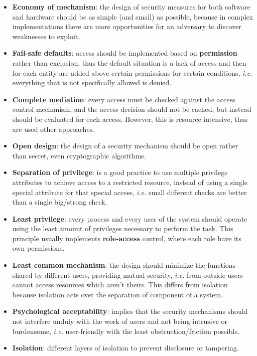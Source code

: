 \documentclass[oneside]{academica}
\begin{document}
\begin{itemize}
  \item \textbf{Economy of mechanism}: the design of security measures for both software and hardware should be as simple (and small) as possible, because in complex implementations there are more opportunities for an adversary to discover weaknesses to exploit.
  \item \textbf{Fail-safe defaults}: access should be implemented based on \textbf{permission} rather than exclusion, thus the default situation is a lack of access and then for each entity are added above certain permissions for certain conditions, \textit{i.e.} everything that is not specifically allowed is denied.
  \item \textbf{Complete mediation}: every access must be checked against the access control mechanism, and the access decision should not be cached, but instead should be evaluated for each access.
    However, this is resource intensive, thus are used other approaches.
  \item \textbf{Open design}: the design of a security mechanism should be open rather than secret, even cryptographic algorithms.
  \item \textbf{Separation of privilege}: is a good practice to use multiple privilege attributes to achieve access to a restricted resource, instead of using a single special attribute for that special access, \textit{i.e.} small different checks are better than a single big/strong check.
  \item \textbf{Least privilege}: every process and every user of the system should operate using the least amount of privileges necessary to perform the task.
    This principle usually implements \textbf{role-access} control, where each role have its own permissions.
  \item \textbf{Least common mechanism}: the design should minimize the functions shared by different users, providing mutual security, \textit{i.e.} from outside users cannot access resources which aren't theirs.
    This differs from isolation because isolation acts over the separation of component of a system.
  \item \textbf{Psychological acceptability}: implies that the security mechanisms should not interfere unduly with the work of users and not being intrusive or burdensome, \textit{i.e.} user-friendly with the least obstruction/friction possible.
  \item \textbf{Isolation}: different layers of isolation to prevent disclosure or tampering.

\end{itemize}
\end{document}
